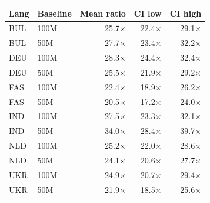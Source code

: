 \begin{tabular}{@{}llrrr@{}}
\toprule
Lang & Baseline & Mean ratio & CI low & CI high \\
\midrule
BUL & 100M & 25.7$\times$ & 22.4$\times$ & 29.1$\times$ \\
BUL & 50M & 27.7$\times$ & 23.4$\times$ & 32.2$\times$ \\
DEU & 100M & 28.3$\times$ & 24.4$\times$ & 32.4$\times$ \\
DEU & 50M & 25.5$\times$ & 21.9$\times$ & 29.2$\times$ \\
FAS & 100M & 22.4$\times$ & 18.9$\times$ & 26.2$\times$ \\
FAS & 50M & 20.5$\times$ & 17.2$\times$ & 24.0$\times$ \\
IND & 100M & 27.5$\times$ & 23.3$\times$ & 32.1$\times$ \\
IND & 50M & 34.0$\times$ & 28.4$\times$ & 39.7$\times$ \\
NLD & 100M & 25.2$\times$ & 22.0$\times$ & 28.6$\times$ \\
NLD & 50M & 24.1$\times$ & 20.6$\times$ & 27.7$\times$ \\
UKR & 100M & 24.9$\times$ & 20.7$\times$ & 29.4$\times$ \\
UKR & 50M & 21.9$\times$ & 18.5$\times$ & 25.6$\times$ \\
\bottomrule
\end{tabular}
